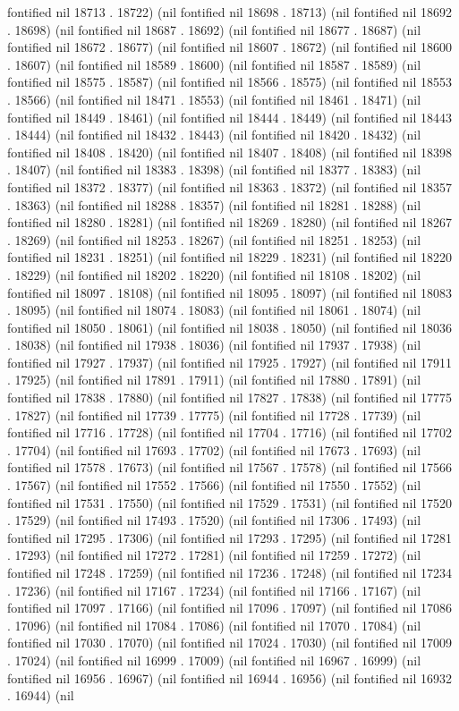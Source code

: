 fontified nil 18713 . 18722) (nil fontified nil 18698 . 18713) (nil fontified nil 18692 . 18698) (nil fontified nil 18687 . 18692) (nil fontified nil 18677 . 18687) (nil fontified nil 18672 . 18677) (nil fontified nil 18607 . 18672) (nil fontified nil 18600 . 18607) (nil fontified nil 18589 . 18600) (nil fontified nil 18587 . 18589) (nil fontified nil 18575 . 18587) (nil fontified nil 18566 . 18575) (nil fontified nil 18553 . 18566) (nil fontified nil 18471 . 18553) (nil fontified nil 18461 . 18471) (nil fontified nil 18449 . 18461) (nil fontified nil 18444 . 18449) (nil fontified nil 18443 . 18444) (nil fontified nil 18432 . 18443) (nil fontified nil 18420 . 18432) (nil fontified nil 18408 . 18420) (nil fontified nil 18407 . 18408) (nil fontified nil 18398 . 18407) (nil fontified nil 18383 . 18398) (nil fontified nil 18377 . 18383) (nil fontified nil 18372 . 18377) (nil fontified nil 18363 . 18372) (nil fontified nil 18357 . 18363) (nil fontified nil 18288 . 18357) (nil fontified nil 18281 . 18288) (nil fontified nil 18280 . 18281) (nil fontified nil 18269 . 18280) (nil fontified nil 18267 . 18269) (nil fontified nil 18253 . 18267) (nil fontified nil 18251 . 18253) (nil fontified nil 18231 . 18251) (nil fontified nil 18229 . 18231) (nil fontified nil 18220 . 18229) (nil fontified nil 18202 . 18220) (nil fontified nil 18108 . 18202) (nil fontified nil 18097 . 18108) (nil fontified nil 18095 . 18097) (nil fontified nil 18083 . 18095) (nil fontified nil 18074 . 18083) (nil fontified nil 18061 . 18074) (nil fontified nil 18050 . 18061) (nil fontified nil 18038 . 18050) (nil fontified nil 18036 . 18038) (nil fontified nil 17938 . 18036) (nil fontified nil 17937 . 17938) (nil fontified nil 17927 . 17937) (nil fontified nil 17925 . 17927) (nil fontified nil 17911 . 17925) (nil fontified nil 17891 . 17911) (nil fontified nil 17880 . 17891) (nil fontified nil 17838 . 17880) (nil fontified nil 17827 . 17838) (nil fontified nil 17775 . 17827) (nil fontified nil 17739 . 17775) (nil fontified nil 17728 . 17739) (nil fontified nil 17716 . 17728) (nil fontified nil 17704 . 17716) (nil fontified nil 17702 . 17704) (nil fontified nil 17693 . 17702) (nil fontified nil 17673 . 17693) (nil fontified nil 17578 . 17673) (nil fontified nil 17567 . 17578) (nil fontified nil 17566 . 17567) (nil fontified nil 17552 . 17566) (nil fontified nil 17550 . 17552) (nil fontified nil 17531 . 17550) (nil fontified nil 17529 . 17531) (nil fontified nil 17520 . 17529) (nil fontified nil 17493 . 17520) (nil fontified nil 17306 . 17493) (nil fontified nil 17295 . 17306) (nil fontified nil 17293 . 17295) (nil fontified nil 17281 . 17293) (nil fontified nil 17272 . 17281) (nil fontified nil 17259 . 17272) (nil fontified nil 17248 . 17259) (nil fontified nil 17236 . 17248) (nil fontified nil 17234 . 17236) (nil fontified nil 17167 . 17234) (nil fontified nil 17166 . 17167) (nil fontified nil 17097 . 17166) (nil fontified nil 17096 . 17097) (nil fontified nil 17086 . 17096) (nil fontified nil 17084 . 17086) (nil fontified nil 17070 . 17084) (nil fontified nil 17030 . 17070) (nil fontified nil 17024 . 17030) (nil fontified nil 17009 . 17024) (nil fontified nil 16999 . 17009) (nil fontified nil 16967 . 16999) (nil fontified nil 16956 . 16967) (nil fontified nil 16944 . 16956) (nil fontified nil 16932 . 16944) (nil 